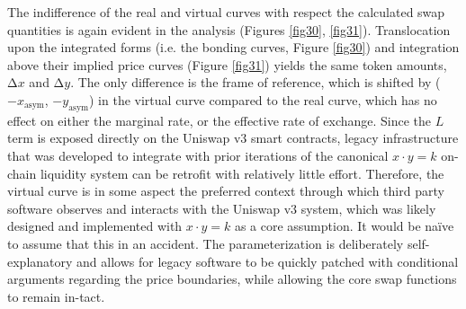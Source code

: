 \documentclass{article}
\begin{document}
The indifference of the real and virtual curves with respect the calculated swap quantities is again evident in the analysis (Figures \ref{fig30}, \ref{fig31}). Translocation upon the integrated forms (i.e. the bonding curves, Figure \ref{fig30}) and integration above their implied price curves (Figure \ref{fig31}) yields the same token amounts, $\mathrm{\Delta}x$ and $\mathrm{\Delta}y$. The only difference is the frame of reference, which is shifted by ($-x_{\text{asym}}$, $-y_{\text{asym}}$) in the virtual curve compared to the real curve, which has no effect on either the marginal rate, or the effective rate of exchange. Since the $L$ term is exposed directly on the Uniswap v3 smart contracts, legacy infrastructure that was developed to integrate with prior iterations of the canonical $x \cdot y = k$ on-chain liquidity system can be retrofit with relatively little effort. Therefore, the virtual curve is in some aspect the preferred context through which third party software observes and interacts with the Uniswap v3 system, which was likely designed and implemented with $x \cdot y = k$ as a core assumption. It would be naïve to assume that this in an accident. The parameterization is deliberately self-explanatory and allows for legacy software to be quickly patched with conditional arguments regarding the price boundaries, while allowing the core swap functions to remain in-tact.
\end{document}
